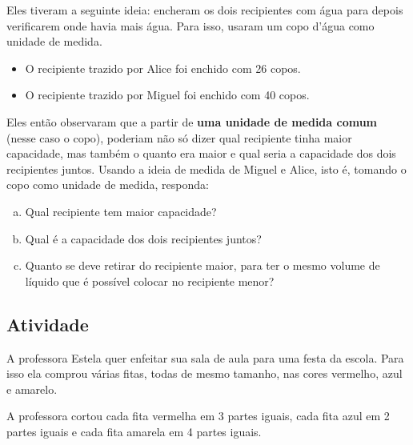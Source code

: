 Eles tiveram a seguinte ideia: encheram os dois recipientes com água para depois verificarem onde havia mais água. Para isso, usaram um copo d'água como unidade de medida. 
\begin{itemize}
 \item O recipiente trazido por Alice foi enchido com 26 copos.
 \item O recipiente trazido por Miguel foi enchido com 40 copos.
\end{itemize}
Eles então observaram que a partir de {\bf uma unidade de medida comum} (nesse caso o copo), poderiam não só dizer qual recipiente tinha maior capacidade, mas também o quanto era maior e qual seria a capacidade dos dois recipientes juntos. 
Usando a ideia de medida de Miguel e Alice, isto é, tomando o copo como unidade de medida, responda:
  \begin{enumerate}[a)]
   \item Qual recipiente tem maior capacidade?
   \item Qual é a capacidade dos dois recipientes juntos?
   \item Quanto se deve retirar do recipiente maior, para ter o mesmo volume de líquido que é possível colocar no recipiente menor?
  \end{enumerate}


\subsection{Atividade}

A professora Estela quer enfeitar sua sala de aula para uma festa da escola. Para isso ela comprou várias fitas, todas de mesmo tamanho, nas cores vermelho, azul e amarelo.
  
\begin{center}
\end{center}


A professora cortou cada fita vermelha em 3 partes iguais, cada fita azul em 2 partes iguais e cada fita amarela em 4 partes iguais.

\begin{center}
\end{center}

